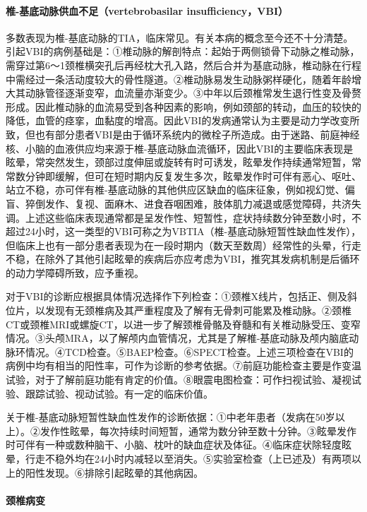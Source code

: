 \paragraph{椎-基底动脉供血不足（vertebrobasilar insufficiency，VBI）}

多数表现为椎-基底动脉的TIA，临床常见。有关本病的概念至今还不十分清楚。引起VBI的病例基础是：①椎动脉的解剖特点：起始于两侧锁骨下动脉之椎动脉，需穿过第6～1颈椎横突孔后再经枕大孔入路，然后合并为基底动脉，椎动脉在行程中需经过一条活动度较大的骨性隧道。②椎动脉易发生动脉粥样硬化，随着年龄增大其动脉管径逐渐变窄，血流量亦渐变少。③中年以后颈椎常发生退行性变及骨赘形成。因此椎动脉的血流易受到各种因素的影响，例如颈部的转动，血压的较快的降低，血管的痉挛，血黏度的增高。因此VBI的发病通常认为主要是动力学改变所致，但也有部分患者VBI是由于循环系统内的微栓子所造成。由于迷路、前庭神经核、小脑的血液供应均来源于椎-基底动脉血流循环，因此VBI的主要临床表现是眩晕，常突然发生，颈部过度伸屈或旋转有时可诱发，眩晕发作持续通常短暂，常常数分钟即缓解，但可在短时期内反复发生多次，眩晕发作时可伴有恶心、呕吐、站立不稳，亦可伴有椎-基底动脉的其他供应区缺血的临床征象，例如视幻觉、偏盲、猝倒发作、复视、面麻木、进食吞咽困难，肢体肌力减退或感觉障碍，共济失调。上述这些临床表现通常都是呈发作性、短暂性，症状持续数分钟至数小时，不超过24小时，这一类型的VBI可称之为VBTIA（椎-基底动脉短暂性缺血性发作），但临床上也有一部分患者表现为在一段时期内（数天至数周）经常性的头晕，行走不稳，在除外了其他引起眩晕的疾病后亦应考虑为VBI，推究其发病机制是后循环的动力学障碍所致，应予重视。

对于VBI的诊断应根据具体情况选择作下列检查：①颈椎X线片，包括正、侧及斜位片，以发现有无颈椎病及其严重程度及了解有无骨刺可能累及椎动脉。②颈椎CT或颈椎MRI或螺旋CT，以进一步了解颈椎骨骼及脊髓和有关椎动脉受压、变窄情况。③头颅MRA，以了解颅内血管情况，尤其是了解椎-基底动脉及颅内脑底动脉环情况。④TCD检查。⑤BAEP检查。⑥SPECT检查。上述三项检查在VBI的病例中均有相当的阳性率，可作为诊断的参考依据。⑦前庭功能检查主要是作变温试验，对于了解前庭功能有肯定的价值。⑧眼震电图检查：可作扫视试验、凝视试验、跟踪试验、视动试验。有一定的临床价值。

关于椎-基底动脉短暂性缺血性发作的诊断依据：①中老年患者（发病在50岁以上）。②发作性眩晕，每次持续时间短暂，通常为数分钟至数十分钟。③眩晕发作时可伴有一种或数种脑干、小脑、枕叶的缺血症状及体征。④临床症状除轻度眩晕，行走不稳外均在24小时内减轻以至消失。⑤实验室检查（上已述及）有两项以上的阳性发现。⑥排除引起眩晕的其他病因。

\paragraph{颈椎病变}

